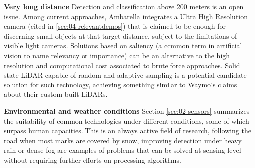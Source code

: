 \textbf{Very long distance} 
    Detection and classification above 200 meters is an open issue. 
    Among current approaches, Ambarella integrates a Ultra High Resolution 
    camera (cited in \ref{sec:04-relevantdemos}) that is claimed to be enough
    for discerning small objects at that target distance, subject to the 
    limitations of visible light cameras.    
    Solutions based on saliency (a common term in artificial vision 
    \cite{Zhang2016a,Palazzi2018,Duthon2016} to name relevancy or importance) 
    can be an alternative to the high resolution and computational cost 
    associated to brute force approaches. Solid state LiDAR capable of
    random and adaptive sampling is a potential candidate solution for such 
    technology, achieving something similar to Waymo's claims about their custom
    built LiDARs.

\textbf{Environmental and weather conditions}    
    Section \ref{sec:02-sensors} summarizes the suitability of common 
    technologies under different conditions, some of which surpass human 
    capacities. 
    This is an always active field of research, following the road  when
    most marks are covered by snow, improving detection under heavy rain 
    or dense fog are examples of problems that can be solved at sensing
    level without requiring further efforts on processing algorithms.
        
%                
    
